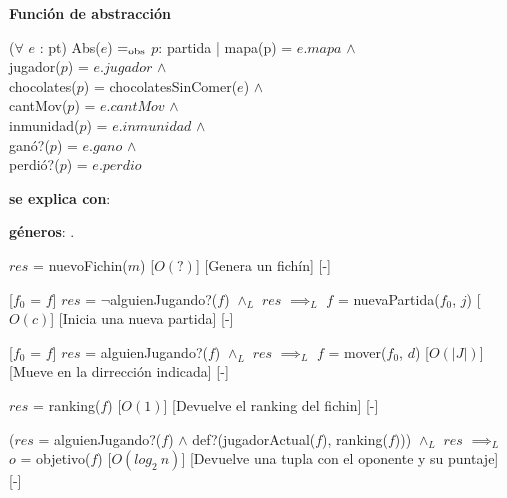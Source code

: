 \documentclass{book}
\begin{document}
    $ $

    \textbf{Función de abstracción}


        ($\forall$ $e$ : pt) Abs($e$) $=_{\mathrm{obs}}$ $p$: partida | mapa(p) = $e.mapa$ $\wedge$ \\
            \text{}\quad\qquad jugador($p$) = $e.jugador$ $\wedge$ \\
            \text{}\quad\qquad chocolates($p$) = chocolatesSinComer($e$) $\wedge$ \\
            \text{}\quad\qquad cantMov($p$) = $e.cantMov$ $\wedge$ \\
            \text{}\quad\qquad inmunidad($p$) = $e.inmunidad$ $\wedge$ \\
            \text{}\quad\qquad ganó?($p$) = $e.gano$ $\wedge$ \\
            \text{}\quad\qquad perdió?($p$) = $e.perdio$

    \newpage

    \begin{Interfaz}

        \textbf{se explica con}: 

        \textbf{géneros}: .


        {$res$ = nuevoFichin($m$)}%
        [$O(?)$]
        [Genera un fichín]
        [-]

        [$f_0$ = $f$]
        {$res$ = $\neg$alguienJugando?($f$) $\wedge_L$ $res$ $\implies_L$ $f$ = nuevaPartida($f_0$, $j$) }%
        [$O(c)$]
        [Inicia una nueva partida]
        [-]

        [$f_0$ = $f$]
        {$res$ = alguienJugando?($f$) $\wedge_L$ $res$ $\implies_L$ $f$ = mover($f_0$, $d$) }%
        [$O(|J|)$]
        [Mueve en la dirrección indicada]
        [-]

        {$res$ = ranking($f$)}%
        [$O(1)$]
        [Devuelve el ranking del fichin]
        [-]

        {($res$ = alguienJugando?($f$) $\wedge$ def?(jugadorActual($f$), ranking($f$))) $\wedge_L$ $res$ $\implies_L$ $o$ = objetivo($f$) }%
        [$O(log_2\ n)$]
        [Devuelve una tupla con el oponente y su puntaje]
        [-]

    \end{Interfaz}
\end{document}
